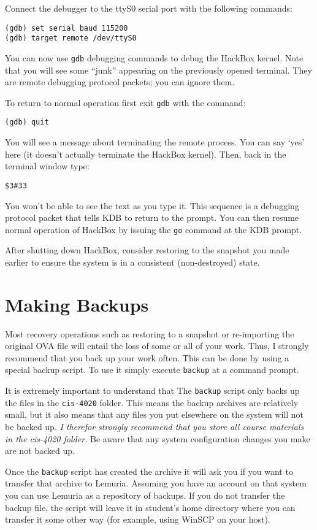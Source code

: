 \documentclass{article}
\newcommand{\command}[1]{\texttt{#1}}
\newcommand{\filename}[1]{\texttt{#1}}
\begin{document}
Connect the debugger to the ttyS0 serial port with the following commands:
\begin{Verbatim}
(gdb) set serial baud 115200
(gdb) target remote /dev/ttyS0
\end{Verbatim}

You can now use \texttt{gdb} debugging commands to debug the HackBox kernel. Note that you will
see some ``junk'' appearing on the previously opened terminal. They are remote debugging
protocol packets; you can ignore them.

To return to normal operation first exit \command{gdb} with the command:
\begin{Verbatim}
(gdb) quit
\end{Verbatim}
You will see a message about terminating the remote process. You can say `yes' here (it doesn't
actually terminate the HackBox kernel). Then, back in the terminal window type:
\begin{Verbatim}
$3#33
\end{Verbatim}
You won't be able to see the text as you type it. This sequence is a debugging protocol packet
that tells KDB to return to the prompt. You can then resume normal operation of HackBox by
issuing the \command{go} command at the KDB prompt.

After shutting down HackBox, consider restoring to the snapshot you made earlier to ensure the
system is in a consistent (non-destroyed) state.

\section{Making Backups}

Most recovery operations such as restoring to a snapshot or re-importing the original OVA file
will entail the loss of some or all of your work. Thus, I strongly recommend that you back up
your work often. This can be done by using a special backup script. To use it simply execute
\command{backup} at a command prompt.

It is extremely important to understand that The \command{backup} script only backs up the files
in the \filename{cis-4020} folder. This means the backup archives are relatively small, but it
also means that any files you put elsewhere on the system will not be backed up. \emph{I
therefor strongly recommend that you store all course materials in the cis-4020 folder.} Be
aware that any system configuration changes you make are not backed up.

Once the \command{backup} script has created the archive it will ask you if you want to transfer
that archive to Lemuria. Assuming you have an account on that system you can use Lemuria as a
repository of backups. If you do not transfer the backup file, the script will leave it in
student's home directory where you can transfer it some other way (for example, using WinSCP on
your host).
\end{document}
